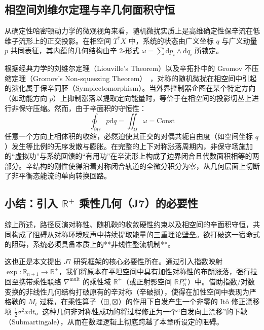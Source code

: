 ﻿\documentclass[10pt,a4paper]{article}
\numberwithin{equation}{section}
\begin{document}
\subsection{相空间刘维尔定理与辛几何面积守恒}
\label{subsec:symplectic_obstruction}

从确定性哈密顿动力学的微观视角来看，随机微扰实质上是高维确定性保辛流在低维子流形上的正交投影。在相空间 $T^*X$ 中，系统的状态由广义坐标 $q$ 与广义动量 $p$ 共同表征，其内蕴的几何结构由辛 2-形式 $\omega = \sum \mathrm{d}p_i \wedge \mathrm{d}q_i$ 所锁定。

根据经典力学的刘维尔定理（Liouville's Theorem）以及辛拓扑中的 Gromov 不压缩定理（Gromov's Non-squeezing Theorem）~\cite{Gromov1985, Arnold1989}，对称的随机微扰在相空间中引起的演化属于保辛同胚（Symplectomorphism）。当外界控制器企图在某个特定方向（如动能方向 $p$）上抑制涨落以提取定向能量时，等价于在相空间的投影切丛上进行非保守压缩。然而，由于辛面积的守恒性：
\begin{equation}
    \oint_{\partial \Omega} p \mathrm{d}q = \iint_{\Omega} \omega = \text{Const}
\end{equation}
任意一个方向上相体积的收缩，必然迫使其正交的对偶共轭自由度（如空间坐标 $q$）发生等比例的无序发散与膨胀。在完整的上下对称涨落周期内，非保守场施加的“虚拟功”与系统回馈的“有用功”在辛流形上构成了边界闭合且代数面积相等的两部分。辛结构的刚性使得沿着对称闭合轨道的全微分积分为零，从几何层面上切断了非平衡态能流的单向转换回路。

\subsection{小结：引入 $\mathbb{R}^+$ 乘性几何（J7）的必要性}
\label{subsec:necessity_of_j7}

综上所述，路径反演对称性、随机鞅的收敛硬性约束以及相空间的辛面积守恒，共同构成了阻碍从对称环境噪声中持续提取能量的三重理论壁垒。欲打破这一宿命式的阻碍，系统必须具备本质上的**非线性整流机制**。

这也正是本文提出 $J7$ 研究框架的核心必要性所在。通过引入指数映射 $\exp: \mathbb{R}_{n+1} \to \mathbb{R}^+$，我们将原本在平坦空间中具有加性对称性的布朗涨落，强行拉回至携带乘性联络 $\nabla^{\mathrm{mult}}$ 的乘性域 $\mathbb{R}^+$（或正射影空间 $\mathbb{R}P^+_n$）中。借助指数/对数变换的非线性几何结构打破原有的辛对称（辛破损），使得在加性空间中表现为严格鞅的 $M_t$ 过程，在乘性算子（$\mathbin{\boxplus}, \mathbin{\boxtimes}$）的作用下自发产生一个非零的 It\^{o} 修正漂移项 $\frac{1}{2}\sigma^2 x \mathrm{d}t$。这种几何非对称性成功的将过程修正为一个“自发向上漂移”的下鞅（Submartingale），从而在数理逻辑上彻底跨越了本章所设定的阻碍。
\end{document}
